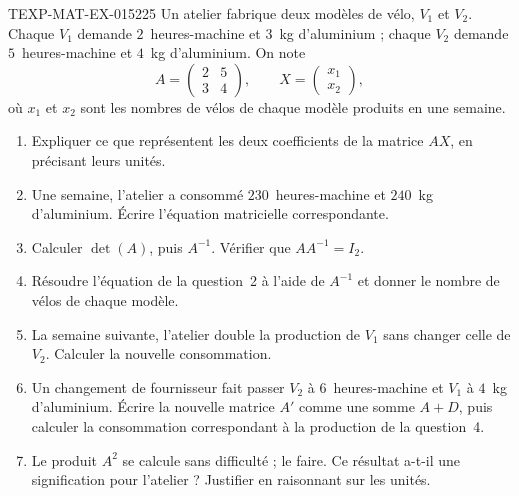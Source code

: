 \begin{exercice}{TEXP-MAT-EX-015}{2}{25}
Un atelier fabrique deux modèles de vélo, $V_1$ et $V_2$. Chaque $V_1$ demande
$2$~heures-machine et $3$~kg d'aluminium ; chaque $V_2$ demande $5$~heures-machine
et $4$~kg d'aluminium. On note
\[
  A=\begin{pmatrix}2&5\\3&4\end{pmatrix},
  \qquad
  X=\begin{pmatrix}x_1\\x_2\end{pmatrix},
\]
où $x_1$ et $x_2$ sont les nombres de vélos de chaque modèle produits en une
semaine.
\begin{enumerate}
  \item Expliquer ce que représentent les deux coefficients de la matrice $AX$,
    en précisant leurs unités.
  \item Une semaine, l'atelier a consommé $230$~heures-machine et $240$~kg
    d'aluminium. Écrire l'équation matricielle correspondante.
  \item Calculer $\det(A)$, puis $A^{-1}$. Vérifier que $AA^{-1}=I_2$.
  \item Résoudre l'équation de la question~2 à l'aide de $A^{-1}$ et donner le
    nombre de vélos de chaque modèle.
  \item La semaine suivante, l'atelier double la production de $V_1$ sans changer
    celle de $V_2$. Calculer la nouvelle consommation.
  \item Un changement de fournisseur fait passer $V_2$ à $6$~heures-machine et
    $V_1$ à $4$~kg d'aluminium. Écrire la nouvelle matrice $A'$ comme une somme
    $A+D$, puis calculer la consommation correspondant à la production de la
    question~4.
  \item Le produit $A^2$ se calcule sans difficulté ; le faire. Ce résultat
    a-t-il une signification pour l'atelier ? Justifier en raisonnant sur les
    unités.
\end{enumerate}
\end{exercice}
